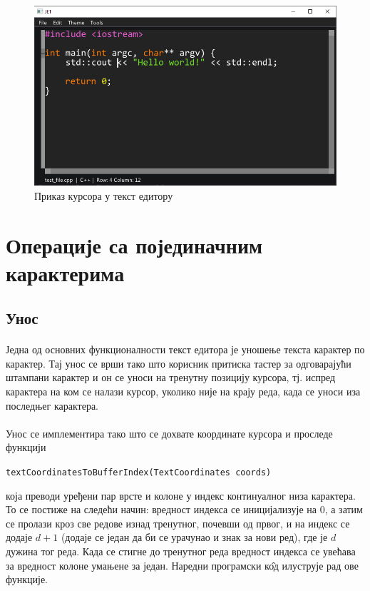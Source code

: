 \documentclass[12pt,oneside]{memoir}
\begin{document}
\begin{figure}[!ht]
	\centering
	\includegraphics[width=1.0\textwidth]{images/cursor.png}
	\caption{Приказ курсора у текст едитору}
	\label{fig:cursor}
\end{figure}

\section{Операције са појединачним карактерима}

\subsection{Унос}
\paragraph{}
Једна од основних функционалности текст едитора је уношење текста карактер
по карактер. Тај унос се врши тако што корисник притиска тастер за одговарајући
штампани карактер и он се уноси на тренутну позицију курсора, тј. испред карактера на ком се налази курсор, уколико није на крају реда, када се уноси иза последњег карактера. 

\paragraph{}
Унос се имплементира тако што се дохвате координате курсора и проследе функцији
\begin{latinica}\verb|textCoordinatesToBufferIndex(TextCoordinates coords)|\end{latinica} 
која преводи уређени пар врсте и колоне у индекс континуалног низа карактера. То се постиже на
следећи начин: вредност индекса се иницијализује на 0, а затим се пролази кроз све редове
изнад тренутног, почевши од првог, и на индекс се додаје \(d+1\) (додаје се један да би се урачунао и знак за нови ред), где је \(d\) дужина тог реда. 
Када се стигне до тренутног реда вредност индекса се увећава за вредност колоне умањене за
један. Наредни програмски к\^{о}д илуструје рад ове функције.
\end{document}

